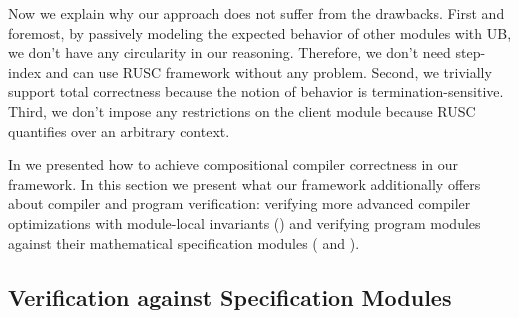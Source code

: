 
\noindent Now we explain why our approach does not suffer from the drawbacks.
First and foremost, by passively modeling the expected behavior of other modules with UB, we don't have any circularity in our reasoning. Therefore, we don't need step-index and can use RUSC framework without any problem.
Second, we trivially support total correctness because the notion of behavior is termination-sensitive.
Third, we don't impose any restrictions on the client module because RUSC quantifies over an arbitrary context.


















In  we presented how to achieve compositional compiler correctness
in our framework.  In this section we present what our framework additionally offers about compiler and
program verification: verifying more advanced compiler optimizations with module-local
invariants () and verifying program modules against their
mathematical specification modules ( and ).



\subsection{Verification against Specification Modules}
\label{sec:overview-modulelocal:program}


